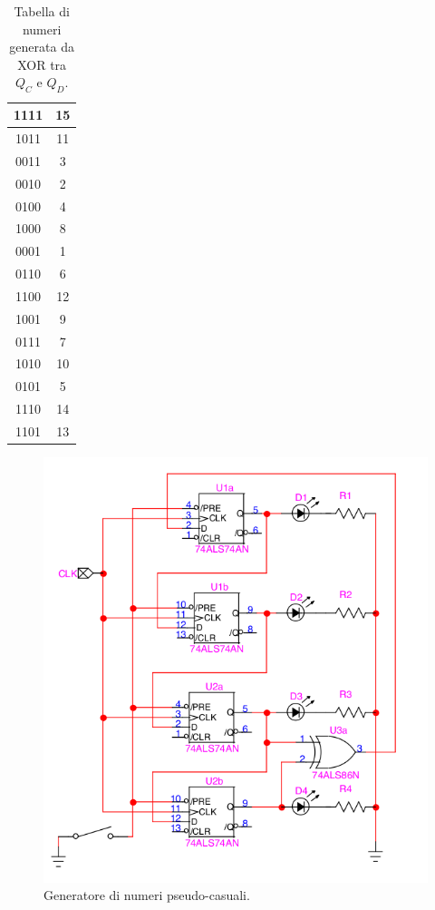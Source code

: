 \documentclass[10pt,a4paper]{article}
\begin{document}
\begin{table}[!htb]
\centering
\begin{tabular}{|c|c|}
\hline 
1111 & 15 \\ 
\hline 
1011 & 11 \\ 
\hline 
0011 & 3 \\ 
\hline 
0010 & 2 \\ 
\hline 
0100 & 4 \\ 
\hline 
1000 & 8 \\ 
\hline 
0001 & 1 \\ 
\hline 
0110 & 6 \\ 
\hline 
1100 & 12 \\ 
\hline 
1001 & 9 \\ 
\hline 
0111 & 7 \\ 
\hline 
1010 & 10 \\ 
\hline 
0101 & 5 \\ 
\hline 
1110 & 14 \\ 
\hline 
1101 & 13 \\ 
\hline 
\end{tabular}
\caption{Tabella di numeri generata da XOR tra $Q_C$ e $Q_D$.\label{CD}} 
\end{table}

\begin{figure}
\centering
\includegraphics[scale=0.5]{pseudi.png}
\caption{Generatore di numeri pseudo-casuali.\label{pseudo}}
\end{figure}
\end{document}
